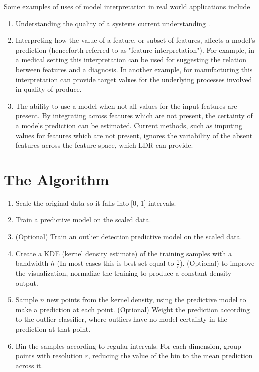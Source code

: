 \documentclass[a4paper, twocolumn]{article}
\begin{document}
Some examples of uses of model interpretation in real world applications include

\begin{enumerate}
\item Understanding the quality of a systems current understanding \cite{amershi2011effective}. 

\item Interpreting how the value of a feature, or subset of features, affects a model's prediction (henceforth referred to as "feature interpretation"). For example, in a medical setting this interpretation can be used for suggesting the relation between features and a diagnosis. In another example, for manufacturing this interpretation can provide target values for the underlying processes involved in quality of produce.

\item The ability to use a model when not all values for the input features are present. By integrating across features which are not present, the certainty of a models prediction can be estimated. Current methods, such as imputing values for features which are not present, ignores the variability of the absent features across the feature space, which LDR can provide.
\end{enumerate}

\section{The Algorithm}

\begin{enumerate}
\item Scale the original data so it falls into [0, 1] intervals.
\item Train a predictive model on the scaled data.
\item (Optional) Train an outlier detection predictive model on the scaled data.
\item Create a KDE (kernel density estimate) \cite{parzen1962estimation} of the training samples with a bandwidth $h$ (In most cases this is best set equal to $\frac{1}{r}$). (Optional) to improve the visualization, normalize the training to produce a constant density output.
\item Sample $n$ new points from the kernel density, using the predictive model to make a prediction at each point. (Optional) Weight the prediction according to the outlier classifier, where outliers have no model certainty in the prediction at that point.
\item Bin the samples according to regular intervals. For each dimension, group points with resolution $r$, reducing the value of the bin to the mean prediction across it.
\end{enumerate}
\end{document}
